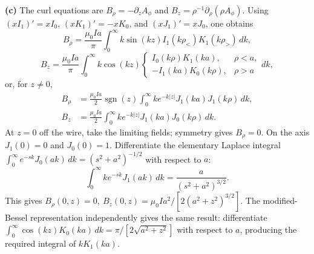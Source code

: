 \textbf{(c)} The curl equations are
$B_\rho=-\partial_zA_\phi$ and
$B_z=\rho^{-1}\partial_\rho(\rho A_\phi)$.
Using $(xI_1)'=xI_0$, $(xK_1)'=-xK_0$, and $(xJ_1)'=xJ_0$, one obtains
\[
B_\rho=\frac{\mu_0Ia}{\pi}\int_0^\infty
k\sin(kz)I_1(k\rho_<)K_1(k\rho_>)\,dk,
\]
\[
B_z=\frac{\mu_0Ia}{\pi}\int_0^\infty k\cos(kz)
\begin{cases}
I_0(k\rho)K_1(ka),&\rho<a,\\
-I_1(ka)K_0(k\rho),&\rho>a
\end{cases}dk,
\]
or, for $z\ne0$,
\[
\boxed{\begin{aligned}
B_\rho&=\frac{\mu_0Ia}{2}\operatorname{sgn}(z)
\int_0^\infty k e^{-k|z|}J_1(ka)J_1(k\rho)\,dk,\\
B_z&=\frac{\mu_0Ia}{2}\int_0^\infty
k e^{-k|z|}J_1(ka)J_0(k\rho)\,dk.
\end{aligned}}
\]
At $z=0$ off the wire, take the limiting fields; symmetry gives
$B_\rho=0$. On the axis $J_1(0)=0$ and $J_0(0)=1$.
Differentiate the elementary Laplace integral
$\int_0^\infty e^{-sk}J_0(ak)\,dk=(s^2+a^2)^{-1/2}$ with respect to $a$:
\[
\int_0^\infty k e^{-sk}J_1(ak)\,dk=\frac{a}{(s^2+a^2)^{3/2}}.
\]
This gives
$\boxed{B_\rho(0,z)=0,\ B_z(0,z)=\mu_0Ia^2/[2(a^2+z^2)^{3/2}]}$.
The modified-Bessel representation independently gives the same result:
differentiate
$\int_0^\infty\cos(kz)K_0(ka)\,dk=\pi/[2\sqrt{a^2+z^2}]$
with respect to $a$, producing the required integral of $kK_1(ka)$.


